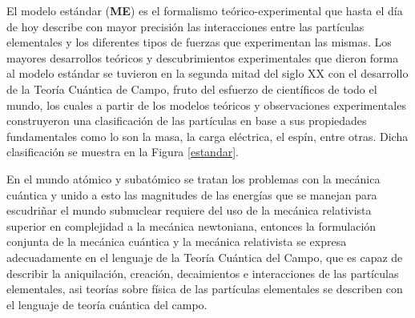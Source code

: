 El modelo estándar (\textbf{ME}) es el formalismo teórico-experimental que hasta el día de hoy describe con mayor precisión las interacciones entre las partículas elementales y los diferentes tipos de fuerzas que experimentan las mismas. Los mayores desarrollos teóricos y descubrimientos experimentales que dieron forma al modelo estándar se tuvieron en la segunda mitad del siglo XX con el desarrollo de la Teoría Cuántica de Campo, fruto del esfuerzo de científicos de todo el mundo, los cuales a partir de los modelos teóricos y observaciones experimentales construyeron una clasificación de las partículas en base a sus propiedades fundamentales como lo son la masa, la carga eléctrica, el espín, entre otras. Dicha clasificación se muestra en la Figura \ref{estandar}. 

En el mundo atómico y subatómico se tratan los problemas con la mecánica cuántica y unido a esto las magnitudes de las energías que se manejan para escudriñar el mundo subnuclear requiere del uso de la mecánica relativista superior en complejidad a la mecánica newtoniana, entonces la formulación conjunta de la mecánica cuántica y la mecánica relativista se expresa adecuadamente en el lenguaje de la Teoría Cuántica del Campo, que es capaz de describir la aniquilación, creación, decaimientos e interacciones de las partículas elementales, asi teorías sobre física de las partículas elementales se describen con el lenguaje de teoría cuántica del campo.

